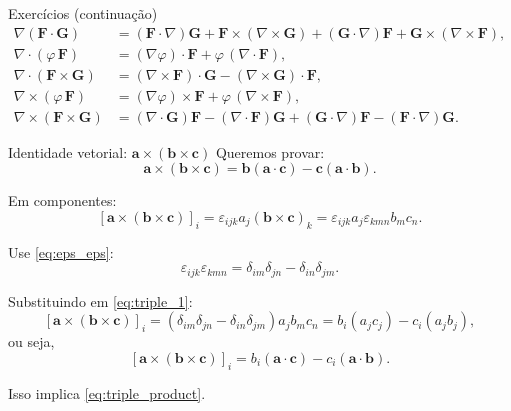 \documentclass[aspectratio=169]{beamer}
\begin{document}
\begin{frame}{Exercícios (continuação)}
\vspace{-0.2cm}
\small
\begin{align}
\nabla(\bm F\cdot \bm G) &= (\bm F\cdot\nabla)\bm G+\bm F\times(\nabla\times\bm G)
+(\bm G\cdot\nabla)\bm F+\bm G\times(\nabla\times\bm F),
\tag{6}\label{eq:ex_id_6}\\[0.15cm]
\nabla\cdot(\varphi\,\bm F) &= (\nabla\varphi)\cdot\bm F+\varphi\,(\nabla\cdot\bm F),
\tag{7}\label{eq:ex_id_7}\\[0.15cm]
\nabla\cdot(\bm F\times \bm G) &= (\nabla\times\bm F)\cdot\bm G-(\nabla\times\bm G)\cdot\bm F,
\tag{8}\label{eq:ex_id_8}\\[0.15cm]
\nabla\times(\varphi\,\bm F) &= (\nabla\varphi)\times\bm F+\varphi\,(\nabla\times\bm F),
\tag{9}\label{eq:ex_id_9}\\[0.15cm]
\nabla\times(\bm F\times \bm G) &= (\nabla\cdot\bm G)\bm F-(\nabla\cdot\bm F)\bm G
+(\bm G\cdot\nabla)\bm F-(\bm F\cdot\nabla)\bm G.
\tag{10}\label{eq:ex_id_10}
\end{align}
\normalsize
\end{frame}

\begin{frame}{Identidade vetorial: $\bm a\times(\bm b\times\bm c)$}
Queremos provar:
\begin{equation}
\bm a\times(\bm b\times\bm c)=\bm b(\bm a\cdot\bm c)-\bm c(\bm a\cdot\bm b).
\label{eq:triple_product}
\end{equation}

Em componentes:
\begin{equation}
\left[\bm a\times(\bm b\times\bm c)\right]_i
=\varepsilon_{ijk}a_j(\bm b\times\bm c)_k
=\varepsilon_{ijk}a_j\varepsilon_{kmn}b_m c_n.
\label{eq:triple_1}
\end{equation}

Use \eqref{eq:eps_eps}:
\begin{equation}
\varepsilon_{ijk}\varepsilon_{kmn}
=\delta_{im}\delta_{jn}-\delta_{in}\delta_{jm}.
\label{eq:eps_contract}
\end{equation}

Substituindo em \eqref{eq:triple_1}:
\begin{equation}
\left[\bm a\times(\bm b\times\bm c)\right]_i
=(\delta_{im}\delta_{jn}-\delta_{in}\delta_{jm})a_j b_m c_n
=b_i(a_j c_j)-c_i(a_j b_j),
\label{eq:triple_2}
\end{equation}
ou seja,
\begin{equation}
\left[\bm a\times(\bm b\times\bm c)\right]_i
=b_i(\bm a\cdot\bm c)-c_i(\bm a\cdot\bm b).
\label{eq:triple_3}
\end{equation}

Isso implica \eqref{eq:triple_product}.
\end{frame}
\end{document}
